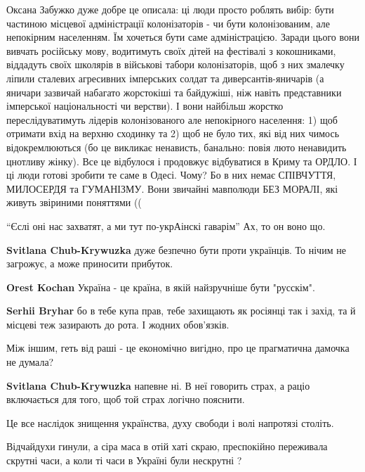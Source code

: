 \begin{itemize}

Оксана Забужко дуже добре це описала: ці люди просто роблять вибір: бути
частиною місцевої адміністрації колонізаторів - чи бути колонізованим, але
непокірним населенням. Їм хочеться бути саме адміністрацією. Заради цього вони
вивчать російську мову, водитимуть своїх дітей на фестівалі з кокошниками,
віддадуть своїх школярів в військові табори колонізаторів, щоб з них змалечку
ліпили сталевих агресивних імперських солдат та диверсантів-яничарів (а яничари
зазвичай набагато жорстокіші та байдужіші, ніж навіть представники імперської
національності чи верстви). І вони найбільш жорстко переслідуватимуть лідерів
колонізованого але непокірного населення: 1) щоб отримати вхід на верхню
сходинку та 2) щоб не було тих, які від них чимось відокремлюються (бо це
викликає ненависть, банально: повія люто ненавидить цнотливу жінку). Все це
відбулося і продовжує відбуватися в Криму та ОРДЛО. І ці люди готові зробити те
саме в Одесі. Чому? Бо в них немає СПІВЧУТТЯ, МИЛОСЕРДЯ та ГУМАНІЗМУ. Вони
звичайні мавполюди БЕЗ МОРАЛІ, які живуть звіриними поняттями ((



\enquote{Єслі оні нас захватят, а ми тут по-укрАінскі гаварім}
Ах, то он воно що.

\begin{itemize} %
\textbf{Svitlana Chub-Krywuzka} дуже безпечно бути проти українців. То нічим не загрожує, а може приносити прибуток.


\textbf{Orest Kochan} Україна - це країна, в якій найзручніше бути "русскім".

\textbf{Serhii Bryhar} бо в тебе купа прав, тебе захищають як росіянці так і захід, та й місцеві теж зазирають до рота. І жодних обов'язків.
\end{itemize} %

Між іншим, геть від раші - це економічно вигідно, про це прагматична дамочка не думала?

\textbf{Svitlana Chub-Krywuzka} напевне ні. В неї говорить страх, а раціо включається для того, щоб той страх логічно пояснити.


Це все наслідок знищення українства, духу свободи і волі напротязі століть.

Відчайдухи гинули, а сіра маса в отій хаті скраю, преспокійно переживала
скрутні часи, а коли ті часи в Україні були нескрутні ?


\end{itemize}
